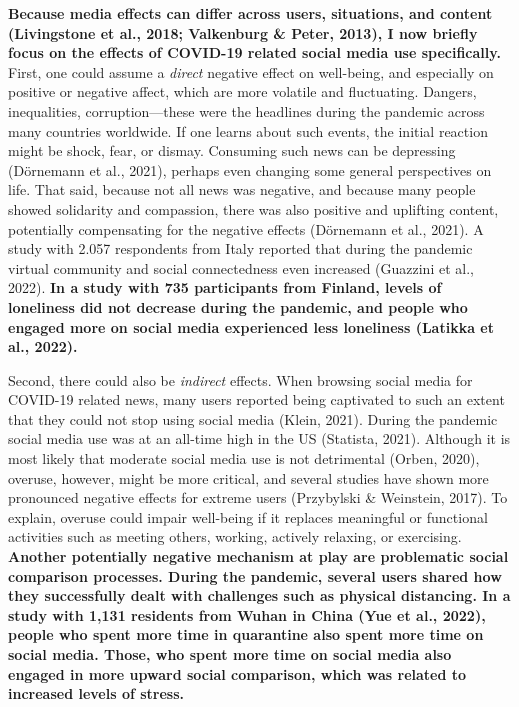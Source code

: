 \documentclass[
  man,mask]{apa7}
\begin{document}
\textbf{Because media effects can differ across users, situations, and content (Livingstone et al., 2018; Valkenburg \& Peter, 2013), I now briefly focus on the effects of COVID-19 related social media use specifically.}
First, one could assume a \emph{direct} negative effect on well-being, and especially on positive or negative affect, which are more volatile and fluctuating.
Dangers, inequalities, corruption---these were the headlines during the pandemic across many countries worldwide.
If one learns about such events, the initial reaction might be shock, fear, or dismay.
Consuming such news can be depressing (Dörnemann et al., 2021), perhaps even changing some general perspectives on life.
That said, because not all news was negative, and because many people showed solidarity and compassion, there was also positive and uplifting content, potentially compensating for the negative effects (Dörnemann et al., 2021).
A study with 2.057 respondents from Italy reported that during the pandemic virtual community and social connectedness even increased (Guazzini et al., 2022).
\textbf{In a study with 735 participants from Finland, levels of loneliness did not decrease during the pandemic, and people who engaged more on social media experienced less loneliness (Latikka et al., 2022).}

Second, there could also be \emph{indirect} effects.
When browsing social media for COVID-19 related news, many users reported being captivated to such an extent that they could not stop using social media (Klein, 2021).
During the pandemic social media use was at an all-time high in the US (Statista, 2021).
Although it is most likely that moderate social media use is not detrimental (Orben, 2020), overuse, however, might be more critical, and several studies have shown more pronounced negative effects for extreme users (Przybylski \& Weinstein, 2017).
To explain, overuse could impair well-being if it replaces meaningful or functional activities such as meeting others, working, actively relaxing, or exercising.
\textbf{Another potentially negative mechanism at play are problematic social comparison processes. During the pandemic, several users shared how they successfully dealt with challenges such as physical distancing. In a study with 1,131 residents from Wuhan in China (Yue et al., 2022), people who spent more time in quarantine also spent more time on social media. Those, who spent more time on social media also engaged in more upward social comparison, which was related to increased levels of stress.}
\end{document}
